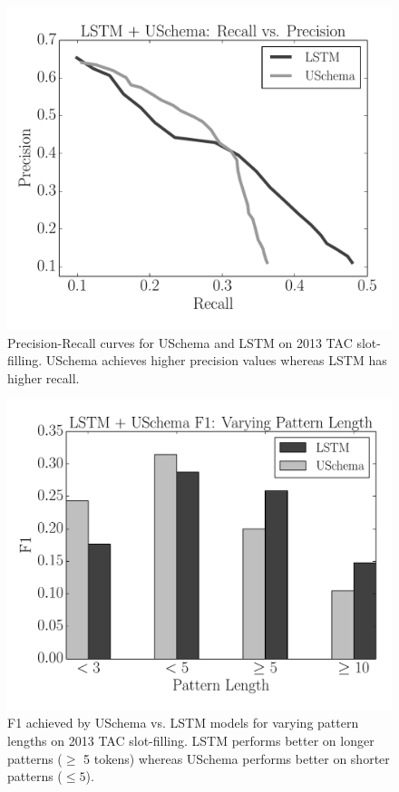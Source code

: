 \begin{figure}
\begin{center}
\includegraphics[scale=0.45]{pr-curve}
\caption{Precision-Recall curves for USchema and LSTM on 2013 TAC slot-filling. USchema achieves higher precision values whereas LSTM has higher recall. \label{fig:pr-curve}}
\end{center}
\end{figure}

\begin{figure}
\begin{center}
\includegraphics[scale=0.45]{f1-vary-pat-length}
\caption{F1 achieved by USchema vs. LSTM models for varying pattern lengths on 2013 TAC slot-filling. LSTM performs better on longer patterns ($\geq$ 5 tokens) whereas USchema performs better on shorter patterns ($\leq 5$). \label{fig:f1-vary-pats}}
\end{center}
\end{figure}

